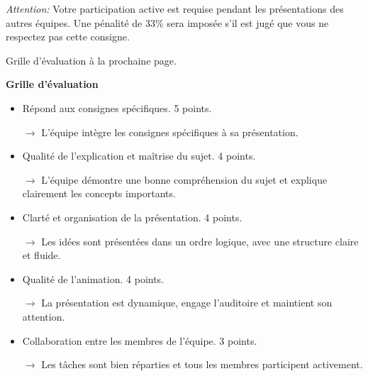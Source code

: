 \documentclass[11pt,french]{article}
\begin{document}
\textit{Attention:} Votre participation active est requise pendant les présentations des autres équipes. Une pénalité de 33\% sera imposée s'il est jugé que vous ne respectez pas cette consigne.

\vfill

Grille d'évaluation à la prochaine page.

\newpage

\textbf{Grille d'évaluation}

\begin{itemize}
    \item Répond aux consignes spécifiques. 5 points.

    $\rightarrow$ L’équipe intègre les consignes spécifiques à sa présentation.
    
    \item Qualité de l'explication et maîtrise du sujet. 4 points.
    
    $\rightarrow$ L’équipe démontre une bonne compréhension du sujet et explique clairement les concepts importants.

    \item Clarté et organisation de la présentation. 4 points.
    
    $\rightarrow$ Les idées sont présentées dans un ordre logique, avec une structure claire et fluide.

    \item Qualité de l'animation. 4 points.

    $\rightarrow$ La présentation est dynamique, engage l’auditoire et maintient son attention.

    \item Collaboration entre les membres de l’équipe. 3 points.

    $\rightarrow$ Les tâches sont bien réparties et tous les membres participent activement.


\end{itemize}
\end{document}
